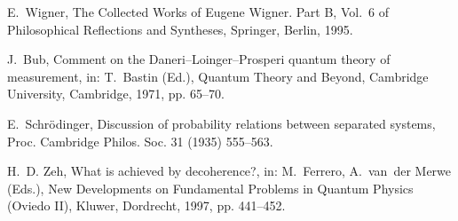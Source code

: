 \documentclass[3p,sort&compress,12pt]{elsarticle}
\begin{document}
\begin{thebibliography}{100}
E.~Wigner, The Collected Works of Eugene Wigner. Part B, Vol.~6 of
  Philosophical Reflections and Syntheses, Springer, Berlin, 1995.

J.~Bub, Comment on the {D}aneri--{L}oinger--{P}rosperi quantum theory of
  measurement, in: T.~Bastin (Ed.), Quantum Theory and Beyond, Cambridge
  University, Cambridge, 1971, pp. 65--70.

E.~Schr{\"o}dinger, Discussion of probability relations between separated
  systems, Proc. Cambridge Philos. Soc. 31 (1935) 555--563.

H.~D. Zeh, What is achieved by decoherence?, in: M.~Ferrero, A.~van~der Merwe
  (Eds.), New Developments on Fundamental Problems in Quantum Physics (Oviedo
  II), Kluwer, Dordrecht, 1997, pp. 441--452.

\end{thebibliography}
\end{document}
